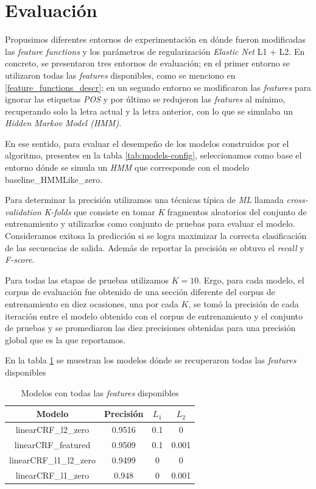 \documentclass[letterpaper,12pt,oneside]{book}
\theoremstyle{definition}
\begin{document}
\section{Evaluación}

Propusimos diferentes entornos de experimentación en dónde fueron modificadas las \textit{feature functions} y los parámetros de regularización \textit{Elastic Net} L1 + L2. En concreto, se presentaron tres entornos de evaluación; en el primer entorno se utilizaron todas las \textit{features} disponibles, como se menciono en \ref{feature_functions_descr}; en un segundo entorno se modificaron las \textit{features} para ignorar las etiquetas \textit{POS} y por último se redujeron las \textit{features} al mínimo, recuperando solo la letra actual y la letra anterior, con lo que se simulaba un \textit{Hidden Markov Model (HMM)}.

En ese sentido, para evaluar el desempeño de los modelos construidos por el algoritmo, presentes en la tabla \ref{tab:models-config}, seleccionamos como base el entorno dónde se simula un \textit{HMM} que corresponde con el modelo \textsf{baseline\_HMMLike\_zero}. 

Para determinar la precisión utilizamos una técnicas típica de \textit{ML} llamada \textit{cross-validation K-folds} que consiste en tomar \textit{K} fragmentos aleatorios del conjunto de entrenamiento y utilizarlos como conjunto de pruebas para evaluar el modelo. Consideramos exitosa la predicción si se logra maximizar la correcta clasificación de las secuencias de salida. Además de reportar la precisión se obtuvo el \textit{recall} y \textit{F-score}.

Para todas las etapas de pruebas utilizamos $K = 10$. Ergo, para cada modelo, el corpus de evaluación fue obtenido de una sección diferente del corpus de entrenamiento en diez ocasiones, una por cada $K$, se tomó la precisión de cada iteración entre el modelo  obtenido con el corpus de entrenamiento y el conjunto de pruebas y se promediaron las diez precisiones obtenidas para una precisión global que es la que reportamos.

En la tabla \ref{tab:models-full-featured} se muestran los modelos dónde se recuperaron todas las \textit{features} disponibles

\begin{table}[ht]
    \centering
    \begin{tabular}{| c | c | c | c |}\hline
    \textbf{Modelo} & \textbf{Precisión} & $L_1$ & $L_2$\\\hline
    \textsf{linearCRF\_l2\_zero} & 0.9516 & 0.1 & 0\\
    \textsf{linearCRF\_featured} & 0.9509 & 0.1 & 0.001\\
    \textsf{linearCRF\_l1\_l2\_zero} & 0.9499 & 0 & 0\\
    \textsf{linearCRF\_l1\_zero} & 0.948 & 0 & 0.001\\\hline
    \end{tabular}
    \caption{Modelos con todas las \textit{features} disponibles}
    \label{tab:models-full-featured}
\end{table}
\end{document}

